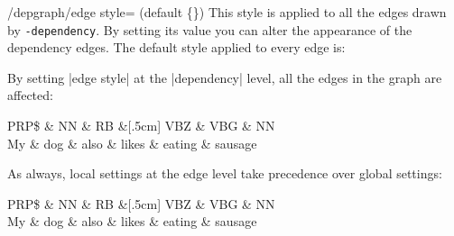 \documentclass[a4paper]{ltxdoc}
\def\pkgname{\tikzname{}\texttt{-dependency}}
\begin{document}
\begin{stylekey}{/depgraph/edge style= (default \{\})}
    This style is applied to all the edges drawn by \pkgname{}. By setting its value you can alter the appearance of the dependency edges. The default style applied to every edge is:
\begin{codeexample}
\end{codeexample}
By setting |edge style| at the |dependency| level, all the edges in the graph are affected:
\begin{codeexample}[]
\begin{dependency}[edge style={red,densely dotted}]
   \begin{deptext}[column sep=.5cm, row sep=.1ex]
      PRP\$ \& NN \& RB \&[.5cm] VBZ \& VBG \& NN \\
      My \& dog \& also \& likes \& eating \& sausage \\
   \end{deptext}
\end{dependency}
\end{codeexample}
As always, local settings at the edge level take precedence over global settings:
\begin{codeexample}[]
\begin{dependency}[edge style={green!60!black,very thick}]
   \begin{deptext}[column sep=.5cm, row sep=.1ex]
      PRP\$ \& NN \& RB \&[.5cm] VBZ \& VBG \& NN \\
      My \& dog \& also \& likes \& eating \& sausage \\
   \end{deptext}
\end{dependency}
\end{codeexample}
\end{stylekey}
\end{document}
